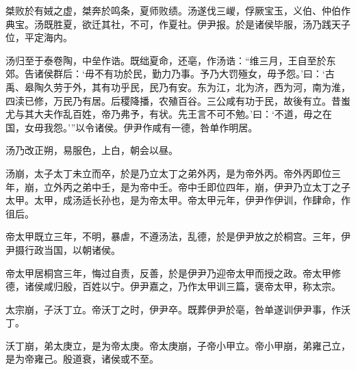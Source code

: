 \documentclass[UTF8,12pt,AutoFakeBold]{ctexart}
\begin{document}
桀败於有娀之虚，桀奔於鸣条，夏师败绩。汤遂伐三嵕，俘厥宝玉，义伯、仲伯作典宝。汤既胜夏，欲迁其社，不可，作夏社。伊尹报。於是诸侯毕服，汤乃践天子位，平定海内。

汤归至于泰卷陶，中垒作诰。既绌夏命，还亳，作汤诰：“维三月，王自至於东郊。告诸侯群后：‘毋不有功於民，勤力乃事。予乃大罚殛女，毋予怨。’曰：‘古禹、皋陶久劳于外，其有功乎民，民乃有安。东为江，北为济，西为河，南为淮，四渎已修，万民乃有居。后稷降播，农殖百谷。三公咸有功于民，故後有立。昔蚩尤与其大夫作乱百姓，帝乃弗予，有状。先王言不可不勉。’曰：‘不道，毋之在国，女毋我怨。’”以令诸侯。伊尹作咸有一德，咎单作明居。

汤乃改正朔，易服色，上白，朝会以昼。

汤崩，太子太丁未立而卒，於是乃立太丁之弟外丙，是为帝外丙。帝外丙即位三年，崩，立外丙之弟中壬，是为帝中壬。帝中壬即位四年，崩，伊尹乃立太丁之子太甲。太甲，成汤适长孙也，是为帝太甲。帝太甲元年，伊尹作伊训，作肆命，作徂后。

帝太甲既立三年，不明，暴虐，不遵汤法，乱德，於是伊尹放之於桐宫。三年，伊尹摄行政当国，以朝诸侯。

帝太甲居桐宫三年，悔过自责，反善，於是伊尹乃迎帝太甲而授之政。帝太甲修德，诸侯咸归殷，百姓以宁。伊尹嘉之，乃作太甲训三篇，褒帝太甲，称太宗。

太宗崩，子沃丁立。帝沃丁之时，伊尹卒。既葬伊尹於亳，咎单遂训伊尹事，作沃丁。

沃丁崩，弟太庚立，是为帝太庚。帝太庚崩，子帝小甲立。帝小甲崩，弟雍己立，是为帝雍己。殷道衰，诸侯或不至。
\end{document}
